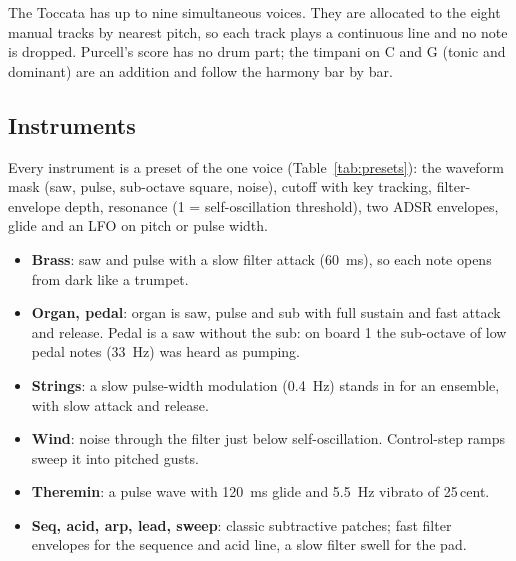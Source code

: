 \documentclass[11pt,a4paper]{article}
\begin{document}
The Toccata has up to nine simultaneous voices. They are allocated to the eight manual tracks by nearest
pitch, so each track plays a continuous line and no note is dropped. Purcell's score has no drum part; the
timpani on C and G (tonic and dominant) are an addition and follow the harmony bar by bar.

\subsection{Instruments}
Every instrument is a preset of the one voice (Table~\ref{tab:presets}): the waveform mask (saw, pulse,
sub-octave square, noise), cutoff with key tracking, filter-envelope depth, resonance (1 = self-oscillation
threshold), two ADSR envelopes, glide and an LFO on pitch or pulse width.
\begin{itemize}
  \item \textbf{Brass}: saw and pulse with a slow filter attack (\SI{60}{ms}), so each note opens from
    dark like a trumpet.
  \item \textbf{Organ, pedal}: organ is saw, pulse and sub with full sustain and fast attack and release.
    Pedal is a saw without the sub: on board 1 the sub-octave of low pedal notes (\SI{33}{Hz}) was heard as
    pumping.
  \item \textbf{Strings}: a slow pulse-width modulation (\SI{0.4}{Hz}) stands in for an ensemble, with
    slow attack and release.
  \item \textbf{Wind}: noise through the filter just below self-oscillation. Control-step ramps sweep it
    into pitched gusts.
  \item \textbf{Theremin}: a pulse wave with \SI{120}{ms} glide and \SI{5.5}{Hz} vibrato of 25\,cent.
  \item \textbf{Seq, acid, arp, lead, sweep}: classic subtractive patches; fast filter envelopes for the
    sequence and acid line, a slow filter swell for the pad.
\end{itemize}
\end{document}
